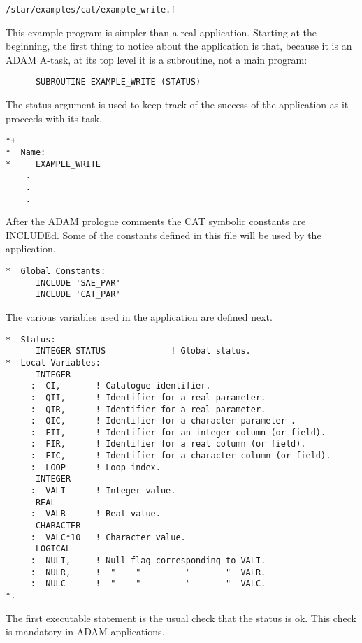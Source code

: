 \begin{center}
{\tt /star/examples/cat/example\_write.f}
\end{center}

This example program is simpler than a real application. Starting at the
beginning, the first thing to notice about the application is that, 
because it is an ADAM A-task, at its top level it is a subroutine, not 
a main program:

\begin{verbatim}
      SUBROUTINE EXAMPLE_WRITE (STATUS)
\end{verbatim}

The status argument is used to keep track of the success of the 
application as it proceeds with its task.

\begin{verbatim}
*+
*  Name:
*     EXAMPLE_WRITE
    .
    .
    .
\end{verbatim}

After the ADAM prologue comments the CAT symbolic constants are
INCLUDEd. Some of the constants defined in this file will be used by
the application.

\begin{verbatim}
*  Global Constants:
      INCLUDE 'SAE_PAR'
      INCLUDE 'CAT_PAR'
\end{verbatim}

The various variables used in the application are defined next.

\begin{verbatim}
*  Status:
      INTEGER STATUS             ! Global status.
*  Local Variables:
      INTEGER 
     :  CI,       ! Catalogue identifier.
     :  QII,      ! Identifier for a real parameter.
     :  QIR,      ! Identifier for a real parameter.
     :  QIC,      ! Identifier for a character parameter .
     :  FII,      ! Identifier for an integer column (or field).
     :  FIR,      ! Identifier for a real column (or field).
     :  FIC,      ! Identifier for a character column (or field).
     :  LOOP      ! Loop index.
      INTEGER
     :  VALI      ! Integer value.
      REAL
     :  VALR      ! Real value.
      CHARACTER
     :  VALC*10   ! Character value.
      LOGICAL
     :  NULI,     ! Null flag corresponding to VALI.
     :  NULR,     !  "    "         "       "  VALR.
     :  NULC      !  "    "         "       "  VALC.
*.
\end{verbatim}

The first executable statement is the usual check that the status is ok.
This check is mandatory in ADAM applications.

